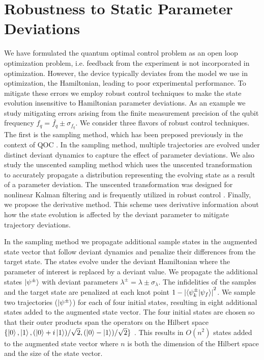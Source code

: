 \documentclass[
  amsfonts,
  amsmath,
  tbtags,
  amssymb,
  aps,
  nobibnotes,
  twocolumn,
  superscriptaddress,
]{revtex4-2}
\begin{document}
\section{Robustness to Static Parameter Deviations}
We have formulated the quantum optimal control
problem as an open loop optimization problem, i.e.
feedback from the experiment is not incorporated in optimization.
However, the device typically deviates from the model we use in optimization,
the Hamiltonian, leading to poor experimental performance. To mitigate
these errors we employ robust control techniques
to make the state evolution insensitive to Hamiltonian
parameter deviations. As an example
we study mitigating errors arising from the finite measurement
precision of the qubit frequency $f_{q} = \bar{f_{q}} \pm \sigma_{f_{q}}$.
We consider three flavors of robust control
techniques. The first is the sampling method, which has
been preposed previously in the context of QOC
\cite{rembold2020introduction, reinhold2019controlling}. In the
sampling method, multiple trajectories are evolved under distinct deviant dynamics
to capture the effect of parameter deviations. We also
study the unscented sampling method which uses the unscented
transformation to accurately propagate a distribution
representing the evolving state as a result of a parameter deviation.
The unscented transformation was designed for nonlinear Kalman
filtering and is frequently utilized in robust control
\cite{julier2004unscented, lee2013sigma, manchester2016derivative}.
Finally, we propose the derivative method. This scheme
uses derivative information about how the state
evolution is affected by the deviant parameter to
mitigate trajectory deviations.

In the sampling method we propagate additional sample states
in the augmented state vector that follow deviant dynamics
and penalize their differences from the target state.
The states evolve under the deviant
Hamiltonian where the parameter of interest is replaced by
a deviant value. We propagate the additional states $\ket{\psi^{\pm}}$ with
deviant parameters $\lambda^{\pm} = \lambda \pm \sigma_{\lambda}$.
The infidelities of the samples and the target
state are penalized at each knot point
$1 - {\lvert \braket{\psi^{\pm}_{k} | \psi_{f}} \rvert}^{2}$.
We sample two trajectories ($\ket{\psi^{\pm}}$) for each of four initial states,
resulting in eight additional states added to the augmented state vector.
The four initial states are chosen so
that their outer products span the operators on the
Hilbert space $\{\ket{0}, \ket{1}, (\ket{0} + i\ket{1}) / \sqrt{2},
(\ket{0} - \ket{1}) / \sqrt{2}\}$ \cite{chow2009randomized}.
This results in $O(n^{2})$ states added to the augmented
state vector where $n$ is both the dimension of the Hilbert space
and the size of the state vector.
\end{document}
